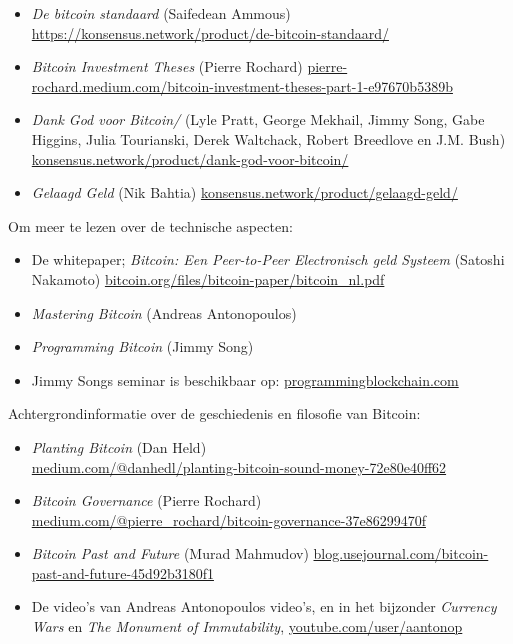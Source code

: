 \documentclass[smalldemyvopaper,11pt,twoside,onecolumn,openright,extrafontsizes]{memoir}
\begin{document}
\begin{itemize}
    \item \textit{De bitcoin standaard} (Saifedean Ammous) \href{https://konsensus.network/product/de-bitcoin-standaard/}{https://konsensus.network/product/de-bitcoin-standaard/}
    \item \textit{Bitcoin Investment Theses} (Pierre Rochard)
    \href{https://pierre-rochard.medium.com/bitcoin-investment-theses-part-1-e97670b5389b}{pierre-rochard.medium.com/bitcoin-investment-theses-part-1-e97670b5389b}
    \item \textit{Dank God voor Bitcoin/} (Lyle Pratt, George Mekhail, Jimmy Song, Gabe Higgins, Julia Tourianski, Derek Waltchack, Robert Breedlove en J.M. Bush) 
    \href{https://konsensus.network/product/dank-god-voor-bitcoin/}{konsensus.network/product/dank-god-voor-bitcoin/}
    \item \textit{Gelaagd Geld} (Nik Bahtia)
    \href{https://konsensus.network/product/gelaagd-geld/}{konsensus.network/product/gelaagd-geld/}
\end{itemize}

Om meer te lezen over de technische aspecten:

\begin{itemize}
    \item De whitepaper; \textit{Bitcoin: Een Peer-to-Peer Electronisch geld Systeem} (Satoshi Nakamoto) \href{https://bitcoin.org/files/bitcoin-paper/bitcoin\_nl.pdf}{bitcoin.org/files/bitcoin-paper/bitcoin\_nl.pdf}
    \item \textit{Mastering Bitcoin} (Andreas Antonopoulos)
    \item \textit{Programming Bitcoin} (Jimmy Song)
    \item Jimmy Songs seminar is beschikbaar op: \href{https://programmingblockchain.com}{programmingblockchain.com}
\end{itemize}

Achtergrondinformatie over de geschiedenis en filosofie van Bitcoin: 

\begin{itemize}
    \item \textit{Planting Bitcoin} (Dan Held)\\
    \href{https://medium.com/@danhedl/planting-bitcoin-sound-money-72e80e40ff62}{medium.com/@danhedl/planting-bitcoin-sound-money-72e80e40ff62}
    \item \textit{Bitcoin Governance} (Pierre Rochard)\\
    \href{https://medium.com/@pierre\_rochard/bitcoin-governance-37e86299470f}{medium.com/@pierre\_rochard/bitcoin-governance-37e86299470f}
    \item \textit{Bitcoin Past and Future} (Murad Mahmudov) \href{https://blog.usejournal.com/bitcoin-past-and-future-45d92b3180f1}{blog.usejournal.com/bitcoin-past-and-future-45d92b3180f1}
    \item De video's van Andreas Antonopoulos video's, en in het bijzonder \textit{Currency Wars} en \textit{The Monument of Immutability}, \href{https://www.youtube.com/user/aantonop}{youtube.com/user/aantonop}
\end{itemize}
\end{document}
